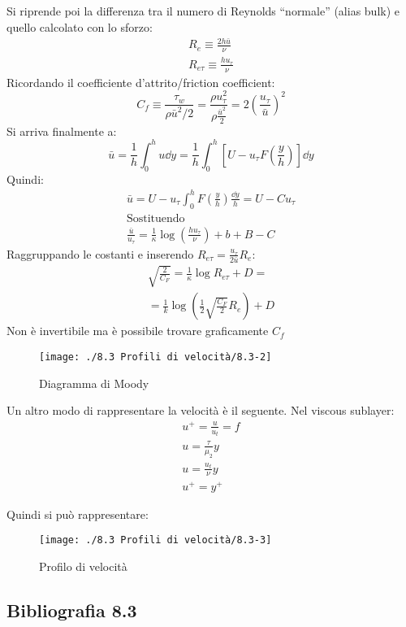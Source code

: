 Si riprende poi la differenza tra il numero di Reynolds ``normale'' (alias bulk) e quello calcolato con lo sforzo:
%
	\begin{equation*}
		\begin{gathered}
			R_e \equiv \frac{2 h \bar{u}}{\nu}\\
			R_{e \tau} \equiv \frac{h u_\tau}{\nu}
		\end{gathered}
	\end{equation*}
%
Ricordando il coefficiente d'attrito/friction coefficient:
%
	\begin{equation*}
		C_f \equiv \frac{\tau_w}{\rho \bar{u}^2/2} = \frac{\rho u^2_\tau}{\rho \frac{\bar{u}^2}{2} } = 2 {\left( \frac{u_\tau}{\bar{u}} \right)}^2
	\end{equation*}
%
Si arriva finalmente a:
%
	\begin{equation*}
		\bar{u} = \frac{1}{h} \int_0^h u \dd{y} = \frac{1}{h} \int_0^h \left[ U - u_\tau F \left( \frac{y}{h} \right) \right] \dd{y}
	\end{equation*}
%
Quindi:
%
	\begin{equation*}
		\begin{gathered}
			\bar{u} = U - u_\tau \int_0^h F \left( \frac{y}{h} \right) \frac{\dd{y}}{h} = U - C u_\tau\\
			\text{Sostituendo}\\
			\frac{\bar{u}}{u_\tau} = \frac{1}{\kappa} \log{\left( \frac{h u_\tau}{\nu} \right)} + b +B -C
		\end{gathered}
	\end{equation*}
%
Raggruppando le costanti e inserendo $R_{e \tau} = \frac{u_\tau}{2 \bar{u}} R_e$:
%
	\begin{equation*}
		\begin{gathered}
			\sqrt{\frac{2}{C_F}} = \frac{1}{\kappa} \log{R_{e \tau}} + D =\\
			= \frac{1}{k} \log{\left( \frac{1}{2} \sqrt{\frac{C_F}{2}} R_e \right)} + D
		\end{gathered}
	\end{equation*}
%
Non è invertibile ma è possibile trovare graficamente $C_f$
%
	\begin{figure}[ht]
		\texttt{[image: ./8.3 Profili di velocità/8.3-2]}
		\centering
		\caption{Diagramma di Moody}
	\end{figure}
%

Un altro modo di rappresentare la velocità è il seguente.
Nel viscous sublayer:
%
	\begin{equation*}
		\begin{gathered}
			u^+ = \frac{u}{u_t} = f\\
			u = \frac{\tau}{\mu_2} y\\
			u = \frac{u_t}{\nu} y \\
			u^+ = y^+
		\end{gathered}
	\end{equation*}
%

Quindi si può rappresentare:
	\begin{figure}[ht]
		\texttt{[image: ./8.3 Profili di velocità/8.3-3]}
		\centering
		\caption{Profilo di velocità}
	\end{figure}
% 


\subsection*{Bibliografia 8.3}
\cite[Cap.\ 12.4, 12.5]{PnueliGutfinger}